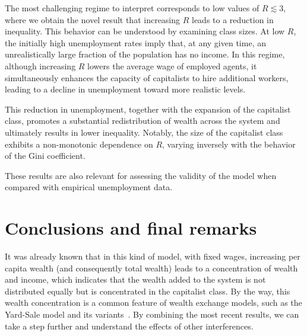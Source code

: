 \documentclass[12pt,preprint]{revtex4-1}
\begin{document}
 The most challenging regime to interpret corresponds to low values of $R\lesssim 3$, where we obtain the novel result that increasing $R$ leads to a reduction in inequality. This behavior can be understood by examining class sizes. At low  $R$,
the initially high unemployment rates imply that, at any given time, an unrealistically large fraction of the population has no income. In this regime, although increasing $R$ lowers the average wage of employed agents, it simultaneously enhances the capacity of capitalists to hire additional workers, leading to a decline in unemployment toward more realistic levels.

This reduction in unemployment, together with the expansion of the capitalist class, promotes a substantial redistribution of wealth across the system and ultimately results in lower inequality. Notably, the size of the capitalist class exhibits a non-monotonic dependence on $R$, varying inversely with the behavior of the Gini coefficient.
 
These results are also relevant for assessing the validity of the model when compared with empirical unemployment data.

 


\section{Conclusions and final remarks}
\label{sec:final}

It was already known that in this kind of model, with fixed wages, increasing per capita wealth (and consequently total wealth) leads to a concentration of wealth and income, which indicates that the wealth added to the system is not distributed equally but is concentrated in the capitalist class. By the way, this wealth concentration is a common feature of wealth exchange models, such as the Yard-Sale  model and its variants~\cite{yakovenko2023,chakraborti2011,boghosian2014a,chakrabarti2013,boghosian2014}.  By combining the most recent results, we can take a step further and understand the effects of other interferences.
\end{document}
